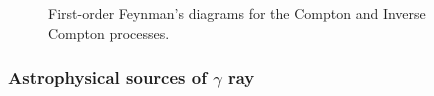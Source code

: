 \begin{itemize}
    \begin{figure}[h!]
        \centering
            \hfill
            \caption{
                First-order Feynman's diagrams for the Compton and
                Inverse Compton processes.
            }
           \label{fig:compton_feynman}
    \end{figure}
\end{itemize}




\subsubsection{Astrophysical sources of $\gamma$ ray}


